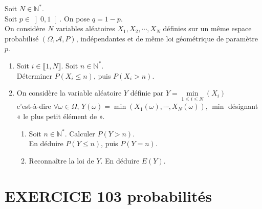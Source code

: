 \documentclass[10pt,oneside]{article}
\begin{document}
\begin{flushleft}
Soit $N\in\mathbb{N}^*$.\\
Soit $p\in\left] 0,1\right[$. On pose $q=1-p$.\\
On considère $N$ variables aléatoires $X_1,X_2,\cdots,X_N$  définies sur un même espace probabilisé $\left(\Omega,\mathcal{A},P\right)$,  indépendantes et de même loi géométrique de paramètre $p$.
\begin{enumerate}
\item
Soit $i\in\llbracket1,N\rrbracket$. Soit $n\in{\mathbb{N}^*}$.\\
Déterminer $P(X_i\leqslant n)$, puis $P(X_i> n)$.
\item
On considère la variable aléatoire $Y$ définie par $Y=\underset{1\leqslant i\leqslant N}{\min}(X_i)$\\
c'est-à-dire $\forall \omega \in\Omega$, $Y(\omega)=\min\left(X_1(\omega),\cdots,X_N(\omega)\right)$, $\min$ désignant « le plus petit élément de ».
\begin{enumerate}
\item 
Soit $n\in{\mathbb{N}^*}$. Calculer $P(Y>n)$.\\ En déduire $P(Y\leqslant n)$, puis $P(Y=n)$.
\item
Reconnaître la loi de $Y$. En déduire $E(Y)$.
\end{enumerate}	

\end{enumerate}


\section*{EXERCICE 103 \:probabilités}





\end{flushleft}
\end{document}
